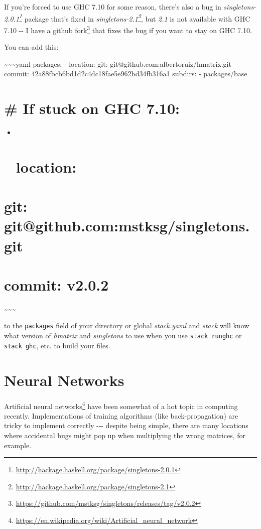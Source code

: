 \documentclass[]{article}
\renewcommand{\href}[2]{#2\footnote{\url{#1}}}
\begin{document}
If you're forced to use GHC 7.10 for some reason, there's also a bug in
\emph{\href{http://hackage.haskell.org/package/singletons-2.0.1}{singletons-2.0.1}}
package that's fixed in
\emph{\href{http://hackage.haskell.org/package/singletons-2.1}{singletons-2.1}},
but \emph{2.1} is not available with GHC 7.10 -\/- I have a
\href{https://github.com/mstksg/singletons/releases/tag/v2.0.2}{github fork}
that fixes the bug if you want to stay on GHC 7.10.

You can add this:

\textasciitilde{}\textasciitilde{}\textasciitilde{}yaml packages: - location:
git: git@github.com:albertoruiz/hmatrix.git commit:
42a88fbcb6bd1d2c4dc18fae5e962bd34fb316a1 subdirs: - packages/base

\section{\# If stuck on GHC 7.10:}

\begin{itemize}
\item ~
  \section{location:}
\end{itemize}

\section{git: git@github.com:mstksg/singletons.git}

\section{commit: v2.0.2}

\textasciitilde{}\textasciitilde{}\textasciitilde{}

to the \texttt{packages} field of your directory or global \emph{stack.yaml} and
\emph{stack} will know what version of \emph{hmatrix} and \emph{singletons} to
use when you use \texttt{stack\ runghc} or \texttt{stack\ ghc}, etc. to build
your files.

\section{Neural Networks}

\href{https://en.wikipedia.org/wiki/Artificial_neural_network}{Artificial neural
networks} have been somewhat of a hot topic in computing recently.
Implementations of training algorithms (like back-propagation) are tricky to
implement correctly -\/-\/- despite being simple, there are many locations where
accidental bugs might pop up when multiplying the wrong matrices, for example.
\end{document}
